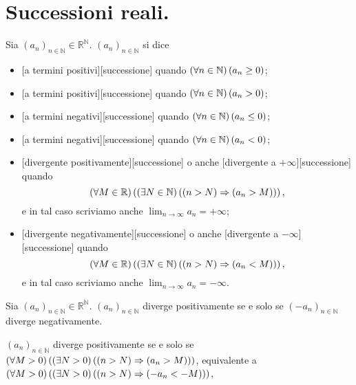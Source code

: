 \section{Successioni reali.}\label{SuccessioniReali}
\begin{Definition}
	Sia $(a_n)_{n \in \mathbb{N}} \in \mathbb{R}^\mathbb{N}$.
  $(a_n)_{n \in \mathbb{N}}$ si dice
	\begin{itemize}
		\item
      [a termini positivi][successione]
      quando $\left ( \forall n \in \mathbb{N} \right ) \left ( a_n \geq 0 \right )$;
		\item
      [a termini positivi][successione]
      quando $\left ( \forall n \in \mathbb{N} \right ) \left ( a_n > 0 \right )$;
		\item
      [a termini negativi][successione]
      quando $\left ( \forall n \in \mathbb{N} \right ) \left ( a_n \leq 0 \right )$;
		\item
      [a termini negativi][successione]
      quando $\left ( \forall n \in \mathbb{N} \right ) \left ( a_n < 0 \right )$;
		\item
      [divergente positivamente][successione]
      o anche
      [divergente a $+\infty$][successione] 
      quando
      \[
        \left ( \forall M \in \mathbb{R} \right ) \left ( 
          \left ( \exists N \in \mathbb{N} \right ) \left ( 
            \left ( n > N \right ) \Rightarrow \left ( a_n > M \right ) \right ) \right ),
      \]
      e in tal caso scriviamo anche
      $\lim_{n \rightarrow \infty} a_n = + \infty$;
		\item
      [divergente negativamente][successione]
      o anche
      [divergente a $-\infty$][successione]
      quando
      \[
        \left ( \forall M \in \mathbb{R} \right ) \left ( 
          \left ( \exists N \in \mathbb{N} \right ) \left ( 
            \left ( n > N \right ) \Rightarrow \left ( 
              a_n < M \right ) \right ) \right ),
      \]
      e in tal caso scriviamo anche
      $\lim_{n \rightarrow \infty} a_n = - \infty$.
	\end{itemize}
\end{Definition}
\begin{Theorem}
	Sia $(a_n)_{n \in \mathbb{N}} \in \mathbb{R}^\mathbb{N}$.
  $(a_n)_{n \in \mathbb{N}}$ diverge positivamente se e solo se
  $(- a_n)_{n \in \mathbb{N}}$ diverge negativamente.
\end{Theorem}
\Proof $(a_n)_{n \in \mathbb{N}}$ diverge positivamente se e solo se
$\left ( \forall M > 0 \right ) \left ( \left ( \exists N > 0 \right ) \left ( \left ( n > N \right ) \Rightarrow \left ( a_n > M \right ) \right ) \right )$,
equivalente a
$\left ( \forall M > 0 \right ) \left ( \left ( \exists N > 0 \right ) \left ( \left ( n > N \right ) \Rightarrow \left ( - a_n < - M \right ) \right ) \right )$,
